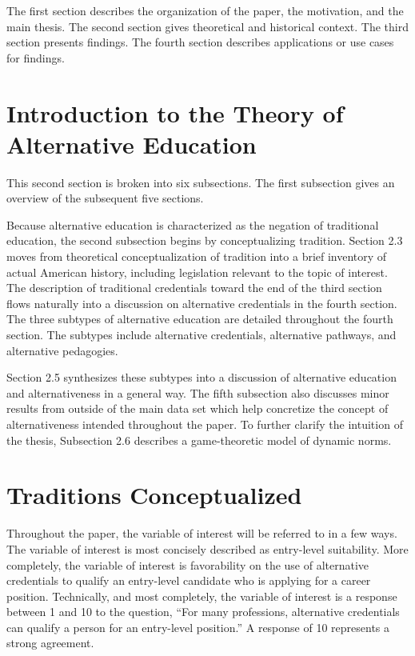 \documentclass[AER]{/Users/zyl357/Documents/GitHub/research-dissertation-case-for-alt-ed/papers/alt-ed-survey/aea-latex-templates/AEA}
\begin{document}
The first section describes the organization of the paper, the motivation,
and the main thesis. The second section gives theoretical and historical
context. The third section presents findings. The fourth section describes
applications or use cases for findings.

\section{Introduction to the Theory of Alternative Education}

This second section is broken into six subsections. The first subsection
gives an overview of the subsequent five sections.

Because alternative education is characterized as the negation of
traditional education, the second subsection begins by conceptualizing
tradition. Section 2.3 moves from theoretical conceptualization of
tradition into a brief inventory of actual American history, including
legislation relevant to the topic of interest. The description of
traditional credentials toward the end of the third section flows
naturally into a discussion on alternative credentials in the fourth
section. The three subtypes of alternative education are detailed
throughout the fourth section. The subtypes include alternative
credentials, alternative pathways, and alternative pedagogies.

Section 2.5 synthesizes these subtypes into a discussion of alternative
education and alternativeness in a general way. The fifth subsection also
discusses minor results from outside of the main data set which help
concretize the concept of alternativeness intended throughout the paper.
To further clarify the intuition of the thesis, Subsection 2.6 describes a
game-theoretic model of dynamic norms.

\section{Traditions Conceptualized}

Throughout the paper, the variable of interest will be referred to in a
few ways. The variable of interest is most concisely described as
entry-level suitability. More completely, the variable of interest is
favorability on the use of alternative credentials to qualify an
entry-level candidate who is applying for a career position. Technically,
and most completely, the variable of interest is a response between 1 and
10 to the question, “For many professions, alternative credentials can
qualify a person for an entry-level position.” A response of 10 represents
a strong agreement.
\end{document}

